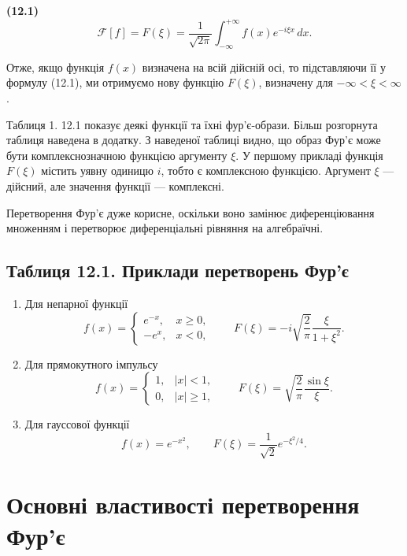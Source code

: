 \documentclass[
  ukrainian,
]{article}
\begin{document}
\textbf{(12.1)} \[
\mathcal{F}[f] = F(\xi) = \frac{1}{\sqrt{2\pi}} \int_{-\infty}^{+\infty} f(x)e^{-i\xi x}\,dx.
\]

Отже, якщо функція \(f(x)\) визначена на всій дійсній осі, то
підставляючи її у формулу (12.1), ми отримуємо нову функцію \(F(\xi)\),
визначену для \(-\infty < \xi < \infty\).

Таблиця 1. 12.1 показує деякі функції та їхні фур'є-образи. Більш
розгорнута таблиця наведена в додатку. З наведеної таблиці видно, що
образ Фур'є може бути комплекснозначною функцією аргументу \(\xi\). У
першому прикладі функція \(F(\xi)\) містить уявну одиницю \(i\), тобто є
комплексною функцією. Аргумент \(\xi\) --- дійсний, але значення функції
--- комплексні.

Перетворення Фур'є дуже корисне, оскільки воно замінює диференціювання
множенням і перетворює диференціальні рівняння на алгебраїчні.

\subsection{Таблиця 12.1. Приклади перетворень
Фур'є}\label{ux442ux430ux431ux43bux438ux446ux44f-12.1.-ux43fux440ux438ux43aux43bux430ux434ux438-ux43fux435ux440ux435ux442ux432ux43eux440ux435ux43dux44c-ux444ux443ux440ux454}

\begin{enumerate}
\def\labelenumi{\arabic{enumi}.}
\item
  Для непарної функції\\
  \[
  f(x)=
  \begin{cases}
  e^{-x}, & x\ge 0,\\
  -e^{x}, & x<0,
  \end{cases}
  \qquad
  F(\xi)=-i\sqrt{\frac{2}{\pi}}\frac{\xi}{1+\xi^2}.
  \]
\item
  Для прямокутного імпульсу\\
  \[
  f(x)=
  \begin{cases}
  1, & |x|<1,\\
  0, & |x|\ge 1,
  \end{cases}
  \qquad
  F(\xi)=\sqrt{\frac{2}{\pi}}\frac{\sin\xi}{\xi}.
  \]
\item
  Для гауссової функції\\
  \[
  f(x)=e^{-x^2},
  \qquad
  F(\xi)=\frac{1}{\sqrt{2}}e^{-\xi^2/4}.
  \]
\end{enumerate}

\section{Основні властивості перетворення
Фур'є}\label{ux43eux441ux43dux43eux432ux43dux456-ux432ux43bux430ux441ux442ux438ux432ux43eux441ux442ux456-ux43fux435ux440ux435ux442ux432ux43eux440ux435ux43dux43dux44f-ux444ux443ux440ux454}
\end{document}
